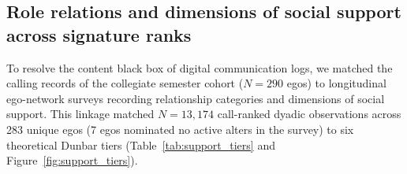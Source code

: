 \documentclass[11pt,letterpaper]{article}
\begin{document}
\subsection*{Role relations and dimensions of social support across signature ranks}

To resolve the content black box of digital communication logs, we matched the calling records of the collegiate semester cohort ($N = 290$ egos) to longitudinal ego-network surveys recording relationship categories and dimensions of social support. This linkage matched $N = 13,174$ call-ranked dyadic observations across 283 unique egos (7 egos nominated no active alters in the survey) to six theoretical Dunbar tiers (Table~\ref{tab:support_tiers} and Figure~\ref{fig:support_tiers}).

\begin{table}[htbp]
\centering
\caption{\textbf{Relational Composition and Support Functions Across Signature Rank Tiers ($N = 13,174$ Dyads)}}
\label{tab:support_tiers}
\small
{}
\end{table}
\end{document}
